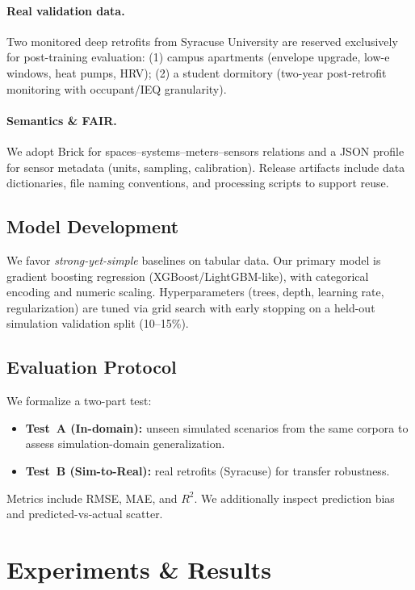 \documentclass{article}
\begin{document}
\paragraph{Real validation data.}
Two monitored deep retrofits from Syracuse University are reserved exclusively for post-training evaluation: 
(1) campus apartments (envelope upgrade, low-e windows, heat pumps, HRV); 
(2) a student dormitory (two-year post-retrofit monitoring with occupant/IEQ granularity).

\paragraph{Semantics \& FAIR.}
We adopt Brick for spaces--systems--meters--sensors relations and a JSON profile for sensor metadata (units, sampling, calibration). 
Release artifacts include data dictionaries, file naming conventions, and processing scripts to support reuse.

\subsection{Model Development}
We favor \emph{strong-yet-simple} baselines on tabular data. 
Our primary model is gradient boosting regression (XGBoost/LightGBM-like), with categorical encoding and numeric scaling. 
Hyperparameters (trees, depth, learning rate, regularization) are tuned via grid search with early stopping on a held-out simulation validation split (10--15\%).

\subsection{Evaluation Protocol}
We formalize a two-part test:
\begin{itemize}
  \item \textbf{Test~A (In-domain):} unseen simulated scenarios from the same corpora to assess simulation-domain generalization.
  \item \textbf{Test~B (Sim-to-Real):} real retrofits (Syracuse) for transfer robustness.
\end{itemize}
Metrics include RMSE, MAE, and $R^2$. 
We additionally inspect prediction bias and predicted-vs-actual scatter.

\section{Experiments \& Results}
\end{document}
